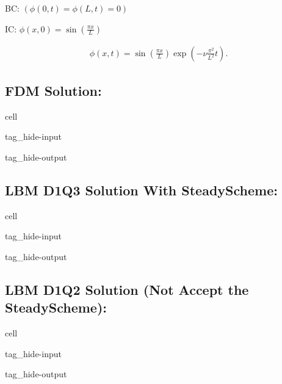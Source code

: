 \documentclass[letterpaper,10pt,english,openany,oneside]{jupyterBook}
\begin{document}
\sphinxAtStartPar
BC: \((\phi(0,t)=\phi(L,t)=0)\)

\sphinxAtStartPar
IC: \(\phi(x,0)=\sin \left(\frac{\pi x}{L}\right)\)

\sphinxAtStartPar
{}
\begin{equation*}
\begin{split}
\phi(x,t)=\sin\left(\frac{\pi x}{L}\right) \exp \left(-\nu \frac{\pi^2}{L^2} t\right).
\end{split}
\end{equation*}

\subsection{FDM Solution:}
\label{\detokenize{LBM-Study/Poisson-Equation:fdm-solution}}
\begin{sphinxuseclass}{cell}
\begin{sphinxuseclass}{tag_hide-input}
\begin{sphinxuseclass}{tag_hide-output}
\end{sphinxuseclass}
\end{sphinxuseclass}
\end{sphinxuseclass}

\subsection{LBM D1Q3 Solution With Steady\sphinxhyphen{}Scheme:}
\label{\detokenize{LBM-Study/Poisson-Equation:lbm-d1q3-solution-with-steady-scheme}}
\begin{sphinxuseclass}{cell}
\begin{sphinxuseclass}{tag_hide-input}
\begin{sphinxuseclass}{tag_hide-output}
\end{sphinxuseclass}
\end{sphinxuseclass}
\end{sphinxuseclass}

\subsection{LBM D1Q2 Solution (Not Accept the Steady\sphinxhyphen{}Scheme):}
\label{\detokenize{LBM-Study/Poisson-Equation:lbm-d1q2-solution-not-accept-the-steady-scheme}}
\begin{sphinxuseclass}{cell}
\begin{sphinxuseclass}{tag_hide-input}
\begin{sphinxuseclass}{tag_hide-output}
\end{sphinxuseclass}
\end{sphinxuseclass}
\end{sphinxuseclass}
\end{document}
